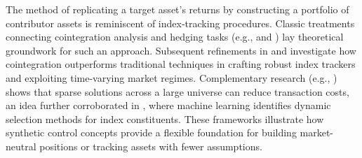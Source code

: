 The method of replicating a target asset's returns by constructing a portfolio of contributor assets is reminiscent of index-tracking procedures. Classic treatments connecting cointegration analysis and hedging tasks (e.g., \cite{Alexander1999} and \cite{Alexander2002}) lay theoretical groundwork for such an approach. Subsequent refinements in \cite{Alexander2005a} and \cite{Alexander2005b} investigate how cointegration outperforms traditional techniques in crafting robust index trackers and exploiting time-varying market regimes. Complementary research (e.g., \cite{Shu2020}) shows that sparse solutions across a large universe can reduce transaction costs, an idea further corroborated in \cite{Bradrania2021}, where machine learning identifies dynamic selection methods for index constituents. These frameworks illustrate how synthetic control concepts provide a flexible foundation for building market-neutral positions or tracking assets with fewer assumptions.
